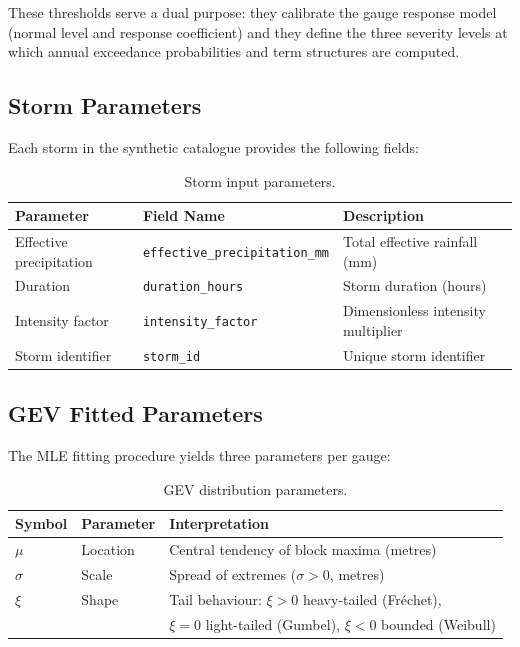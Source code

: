 \documentclass[11pt,a4paper]{article}
\begin{document}
\noindent These thresholds serve a dual purpose: they calibrate the gauge response model (normal level and response coefficient) and they define the three severity levels at which annual exceedance probabilities and term structures are computed.

\subsection{Storm Parameters}

Each storm in the synthetic catalogue provides the following fields:

\begin{table}[H]
\centering
\caption{Storm input parameters.}
\label{tab:storm_params}
\begin{tabular}{lll}
\toprule
\textbf{Parameter} & \textbf{Field Name} & \textbf{Description} \\
\midrule
Effective precipitation & \texttt{effective\_precipitation\_mm} & Total effective rainfall (mm) \\
Duration                & \texttt{duration\_hours}              & Storm duration (hours) \\
Intensity factor        & \texttt{intensity\_factor}            & Dimensionless intensity multiplier \\
Storm identifier        & \texttt{storm\_id}                    & Unique storm identifier \\
\bottomrule
\end{tabular}
\end{table}

\subsection{GEV Fitted Parameters}

The MLE fitting procedure yields three parameters per gauge:

\begin{table}[H]
\centering
\caption{GEV distribution parameters.}
\label{tab:gev_params}
\begin{tabular}{lll}
\toprule
\textbf{Symbol} & \textbf{Parameter} & \textbf{Interpretation} \\
\midrule
$\mu$   & Location & Central tendency of block maxima (metres) \\
$\sigma$ & Scale   & Spread of extremes ($\sigma > 0$, metres) \\
$\xi$   & Shape    & Tail behaviour: $\xi > 0$ heavy-tailed (Fr\'{e}chet), \\
        &          & $\xi = 0$ light-tailed (Gumbel), $\xi < 0$ bounded (Weibull) \\
\bottomrule
\end{tabular}
\end{table}
\end{document}
